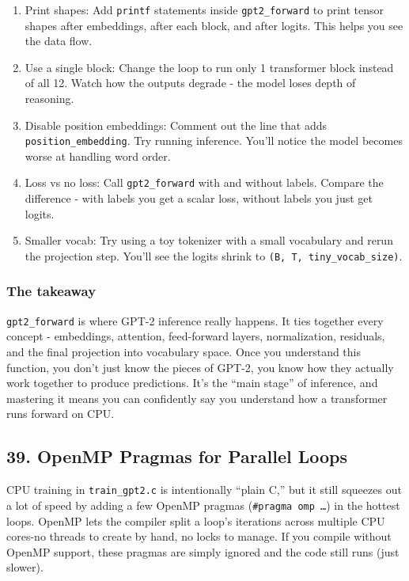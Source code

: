 \documentclass[
  letterpaper,
  DIV=11,
  numbers=noendperiod]{scrreprt}
\providecommand{\tightlist}{%
  \setlength{\itemsep}{0pt}\setlength{\parskip}{0pt}}
\begin{document}
\begin{enumerate}
\def\labelenumi{\arabic{enumi}.}
\tightlist
\item
  Print shapes: Add \texttt{printf} statements inside
  \texttt{gpt2\_forward} to print tensor shapes after embeddings, after
  each block, and after logits. This helps you see the data flow.
\item
  Use a single block: Change the loop to run only 1 transformer block
  instead of all 12. Watch how the outputs degrade - the model loses
  depth of reasoning.
\item
  Disable position embeddings: Comment out the line that adds
  \texttt{position\_embedding}. Try running inference. You'll notice the
  model becomes worse at handling word order.
\item
  Loss vs no loss: Call \texttt{gpt2\_forward} with and without labels.
  Compare the difference - with labels you get a scalar loss, without
  labels you just get logits.
\item
  Smaller vocab: Try using a toy tokenizer with a small vocabulary and
  rerun the projection step. You'll see the logits shrink to
  \texttt{(B,\ T,\ tiny\_vocab\_size)}.
\end{enumerate}

\subsubsection{The takeaway}\label{the-takeaway-27}

\texttt{gpt2\_forward} is where GPT-2 inference really happens. It ties
together every concept - embeddings, attention, feed-forward layers,
normalization, residuals, and the final projection into vocabulary
space. Once you understand this function, you don't just know the pieces
of GPT-2, you know how they actually work together to produce
predictions. It's the ``main stage'' of inference, and mastering it
means you can confidently say you understand how a transformer runs
forward on CPU.

\subsection{39. OpenMP Pragmas for Parallel
Loops}\label{openmp-pragmas-for-parallel-loops}

CPU training in \texttt{train\_gpt2.c} is intentionally ``plain C,'' but
it still squeezes out a lot of speed by adding a few OpenMP pragmas
(\texttt{\#pragma\ omp\ …}) in the hottest loops. OpenMP lets the
compiler split a loop's iterations across multiple CPU cores-no threads
to create by hand, no locks to manage. If you compile without OpenMP
support, these pragmas are simply ignored and the code still runs (just
slower).
\end{document}
